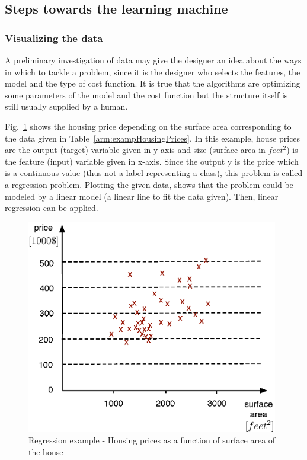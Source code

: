 

\subsection{Steps towards the learning machine}

\subsubsection{Visualizing the data}

A preliminary investigation of data may give the designer an idea about the ways in which to tackle a problem, since it is the designer who selects the features, the model and the type of cost function. 
It is true that the algorithms are optimizing some parameters of the model and the cost function but the structure itself is still usually supplied by a human. 

Fig.~\ref{fig:housingPrices} shows the housing price depending on the surface area corresponding to the data given in Table~\ref{arm:exampHousingPrices}.
In this example, house prices are the output (target) variable given in y-axis and size (surface area in $feet^2$) is the feature (input) variable given in x-axis. 
Since the output y is the price which is a continuous value (thus not a label representing a class), this problem is called a regression problem. Plotting the given data, shows that the problem could be modeled by a linear model (a linear line to fit the data given). Then, linear regression can be applied.

\begin{figure}
\begin{center}
\includegraphics[width=11cm]{figures/linearRegressionExamp}    %
\caption{Regression example - Housing prices as a function of surface area of the house \cite{andrewNg_MachLearning}} 
\label{fig:housingPrices}
\end{center}
\end{figure}


